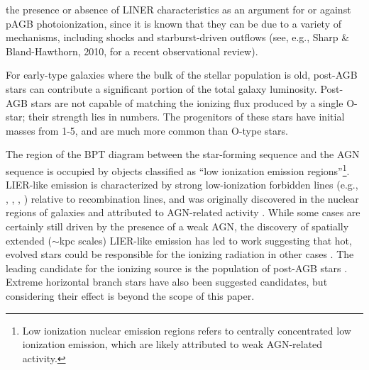 the presence or
absence of LINER characteristics as an argument for or against
pAGB photoionization, since it is known that they can be due to
a variety of mechanisms, including shocks and starburst-driven
outflows (see, e.g., Sharp & Bland-Hawthorn, 2010, for a recent
observational review).


For early-type galaxies where the bulk of the stellar population is old, post-AGB stars can contribute a significant portion of the total galaxy luminosity. Post-AGB stars are not capable of matching the ionizing flux produced by a single O-star; their strength lies in numbers. The progenitors of these stars have initial masses from 1-5\Msun{}, and are much more common than O-type stars.




The region of the BPT diagram between the star-forming sequence and the AGN sequence is occupied by objects classified as ``low ionization emission regions''\citep[LIERs, ][]{Belfiore16}\footnote{Low ionization nuclear emission regions \citep[LINERs, ][]{Heckman1980} refers to centrally concentrated low ionization emission, which are likely attributed to weak AGN-related activity.}. LIER-like emission is characterized by strong low-ionization forbidden lines (e.g., \nii{}, \sii{}, \oii{}, \oi{}) relative to recombination lines, and was originally discovered in the nuclear regions of galaxies and attributed to AGN-related activity \citep{Kauffmann03b, Kewley06, Ho08}. While some cases are certainly still driven by the presence of a weak AGN, the discovery of spatially extended (${\sim}$kpc scales) LIER-like emission has led to work suggesting that hot, evolved stars could be responsible for the ionizing radiation in other cases \citep{Singh13, Belfiore16}. The leading candidate for the ionizing source is the population of post-AGB stars \citep{Binette94, Sarzi10, Yan12}. Extreme horizontal branch stars have also been suggested candidates, but considering their effect is beyond the scope of this paper.

